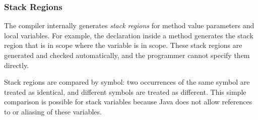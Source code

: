 \subsubsection{Stack Regions}
\label{section:regions:stack}

The compiler internally generates \emph{stack regions} for method
value parameters and local variables.  For example, the declaration
 inside a method generates the stack region  that is
in scope where the variable  is in scope.  These stack regions
are generated and checked automatically, and the programmer cannot
specify them directly.

Stack regions are compared by symbol: two occurrences of the same
symbol are treated as identical, and different symbols are treated as
different.  This simple comparison is possible for stack variables
because Java does not allow references to or aliasing of these
variables.

